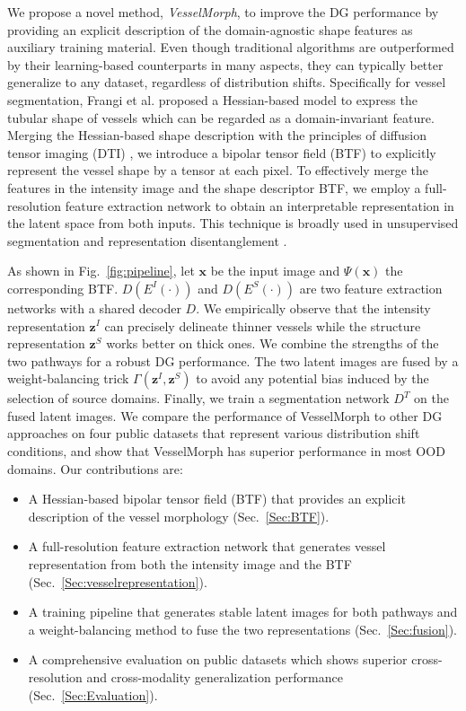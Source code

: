 \documentclass[runningheads]{llncs}
\begin{document}
We propose a novel method, \textit{VesselMorph}, to improve the DG performance by providing an explicit description of the domain-agnostic shape features as auxiliary training material. Even though traditional algorithms are outperformed by their learning-based counterparts in many aspects, they can typically  better generalize to any dataset, regardless of distribution shifts. Specifically for vessel segmentation, Frangi et al. \cite{frangi1998multiscale} proposed a Hessian-based model to express the tubular shape of vessels which can be regarded as a domain-invariant feature. Merging the Hessian-based shape description \cite{hu2021domain} with the principles of diffusion tensor imaging (DTI) \cite{le2001diffusion}, we introduce a bipolar tensor field (BTF) to explicitly represent the vessel shape by a tensor at each pixel. To effectively merge the features in the intensity image and the shape descriptor BTF, we employ a full-resolution feature extraction network to obtain an interpretable representation in the latent space from both inputs. This technique is broadly used in unsupervised segmentation \cite{liu2020variational,hu2021life} and representation disentanglement \cite{dewey2020disentangled,ouyang2021representation}. 

As shown in Fig.~\ref{fig:pipeline}, let $\mathbf{x}$ be the input image and $\Psi(\mathbf{x})$ the corresponding BTF. $D(E^I(\cdot))$ and $D(E^S(\cdot))$ are two feature extraction networks with a shared decoder $D$. We empirically observe that the intensity representation $\mathbf{z}^I$ can precisely delineate thinner vessels while the structure representation $\mathbf{z}^S$ works better on thick ones. We combine the strengths of the two pathways for a robust DG performance. The two latent images are fused by a weight-balancing trick $\Gamma(\mathbf{z}^I,\mathbf{z}^S)$ to avoid any potential bias induced by the selection of source domains. Finally, we train a segmentation network $D^T$ on the fused latent images. We compare the performance of VesselMorph to other DG approaches on four public datasets that represent various distribution shift conditions, and show that VesselMorph has superior performance in most OOD domains. Our contributions are:

\begin{itemize}
    \item[\ding{118}] A Hessian-based bipolar tensor field (BTF) that provides an explicit description of the vessel morphology (Sec.~\ref{Sec:BTF}).
    \item[\ding{118}] A full-resolution feature extraction network that generates vessel representation from both  the intensity image and the BTF (Sec.~\ref{Sec:vesselrepresentation}).
    \item[\ding{118}] A training pipeline that generates stable latent images for both pathways and a weight-balancing method to fuse the two representations (Sec.~\ref{Sec:fusion}).
    \item[\ding{118}] A comprehensive evaluation on public datasets which shows superior cross-resolution and cross-modality generalization performance (Sec.~\ref{Sec:Evaluation}).
\end{itemize}      
\end{document}
